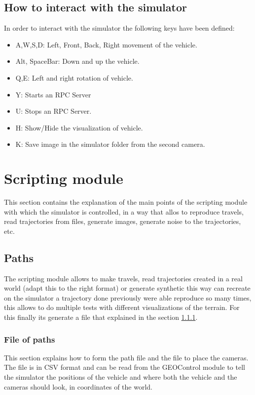 \documentclass[10pt,a4paper,twocolumn,twoside]{article}
\begin{document}
\subsection{How to interact with the simulator}
In order to interact with the simulator the following keys have been defined:

\begin{itemize}
\setlength\itemsep{0em}
\item A,W,S,D: Left, Front, Back, Right movement of the vehicle.
\item Alt, SpaceBar: Down and up the vehicle.
\item Q,E: Left and right rotation of vehicle.
\item Y: Starts an RPC Server
\item U: Stops an RPC Server.
\item H: Show/Hide the visualization of vehicle.
\item K: Save image in the simulator folder from the second camera.
\end{itemize}

\section{Scripting module}
\label{modulescript}

This section contains the explanation of the main points of the scripting module with which the simulator is controlled, in a way that allos to reproduce travels, read trajectories from files, generate images, generate noise to the trajectories, etc.

\subsection{Paths}
The scripting module allows to make travels, read trajectories created in a real world (adapt this to the right format) or generate synthetic this way can recreate on the simulator a trajectory done previously were able reproduce so many times, this allows to do multiple tests with different visualizations of the terrain. For this finally its generate a file that explained in the section \ref{file-trajectories}.

\subsubsection{File of paths}
\label{file-trajectories}
This section explains how to form the path file and the file to place the cameras. The file is in CSV format and can be read from the GEOControl module to tell the simulator the positions of the vehicle and where both the vehicle and the cameras should look, in coordinates of the world.
\end{document}
